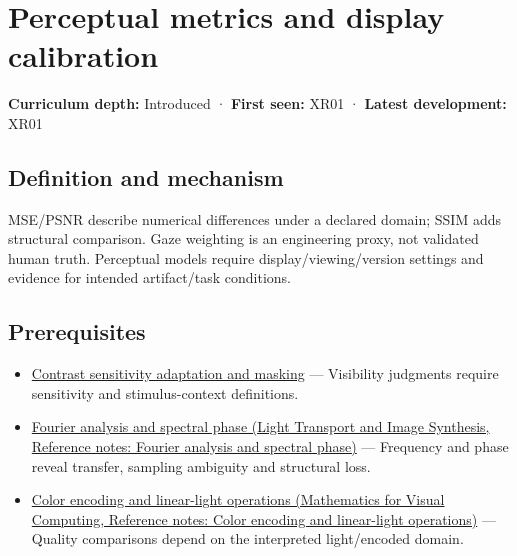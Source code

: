 \hypertarget{appendix-b2c1846508bf}{}\label{referencestart:appendix-b2c1846508bf}
\section{Perceptual metrics and display calibration}\label{appendix-b2c1846508bf-perceptual-metrics-and-display-calibration}

\textbf{Curriculum depth:} Introduced · \textbf{First seen:} XR01 · \textbf{Latest development:} XR01

\begin{allmightroledefinition}

\subsection{Definition and mechanism}\label{appendix-b2c1846508bf-definition-and-mechanism}

MSE/PSNR describe numerical differences under a declared domain; SSIM adds structural comparison. Gaze weighting is an engineering proxy, not validated human truth. Perceptual models require display/viewing/version settings and evidence for intended artifact/task conditions.

\end{allmightroledefinition}

\subsection{Prerequisites}\label{appendix-b2c1846508bf-prerequisites}

\begin{itemize}
\tightlist
\item
  \hyperref[appendix-b3aa9e8e01ad]{Contrast sensitivity adaptation and masking} --- Visibility judgments require sensitivity and stimulus-context definitions.
\item
  \href{../04-Light-Transport-and-Image-Synthesis/main.pdf\#nameddest=appendix-b60686ba06a1}{Fourier analysis and spectral phase (Light Transport and Image Synthesis, Reference notes: Fourier analysis and spectral phase)} --- Frequency and phase reveal transfer, sampling ambiguity and structural loss.
\item
  \href{../02-Mathematics-for-Visual-Computing/main.pdf\#nameddest=appendix-a9f83ad40792}{Color encoding and linear-light operations (Mathematics for Visual Computing, Reference notes: Color encoding and linear-light operations)} --- Quality comparisons depend on the interpreted light/encoded domain.
\end{itemize}

